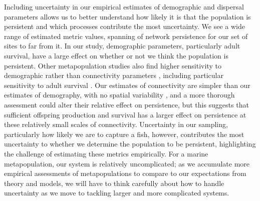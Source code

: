 \documentclass[12pt, oneside]{article}   	%
\begin{document}
Including uncertainty in our empirical estimates of demographic and dispersal parameters allows us to better understand how likely it is that the population is persistent and which processes contribute the most uncertainty. We see a wide range of estimated metric values, spanning of network persistence for our set of sites to far from it. In our study, demographic parameters, particularly adult survival, have a large effect on whether or not we think the population is persistent. Other metapopulation studies also find higher sensitivity to demographic rather than connectivity parameters \citep[e.g., on source or sink status in bicolor damselfish;][]{figueira2009connectivity}, including particular sensitivity to adult survival \citep[on metapopulation growth rate in mussels;][]{carson2011evaluating}. Our estimates of connectivity are simpler than our estimates of demography, with no spatial variability \citep[which can be important in understanding demographic connectivity;][]{johnson2018integrating}, and a more thorough assessment could alter their relative effect on persistence, but this suggests that sufficient offspring production and survival has a larger effect on persistence at these relatively small scales of connectivity. Uncertainty in our sampling, particularly how likely we are to capture a fish, however, contributes the most uncertainty to whether we determine the population to be persistent, highlighting the challenge of estimating these metrics empirically. For a marine metapopulation, our system is relatively uncomplicated; as we accumulate more empirical assessments of metapopulations to compare to our expectations from theory and models, we will have to think carefully about how to handle uncertainty as we move to tackling larger and more complicated systems.
\end{document}
